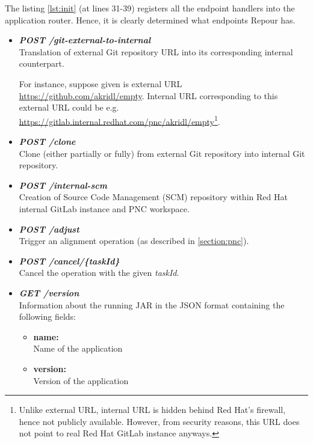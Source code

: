 \documentclass[../main.tex]{subfiles}
\begin{document}
The listing \ref{lst:init} (at lines 31-39) registers all the endpoint handlers into the application router. Hence, it is clearly determined what endpoints Repour has.

\begin{itemize}
    \item \textbf{\textit{POST /git-external-to-internal}}\\
    Translation of external Git repository URL into its corresponding internal counterpart.

    For instance, suppose given is external URL \url{https://github.com/akridl/empty}. Internal URL corresponding to this external URL could be e.g. \url{https://gitlab.internal.redhat.com/pnc/akridl/empty}\footnote{Unlike external URL, internal URL is hidden behind Red Hat's firewall, hence not publicly available. However, from security reasons, this URL does not point to real Red Hat GitLab instance anyways.}.

    \item \textbf{\textit{POST /clone}}\\
    Clone (either partially or fully) from external Git repository into internal Git repository.
    
    \item \textbf{\textit{POST /internal-scm}}\\
    Creation of Source Code Management (SCM) repository within Red Hat internal GitLab instance and PNC workspace.

    \item \textbf{\textit{POST /adjust}}\\
    Trigger an alignment operation (as described in \ref{section:pnc}).

    \item \textbf{\textit{POST /cancel/\{taskId\}}}\\
    Cancel the operation with the given \textit{taskId}.
    
    \item \textbf{\textit{GET /version}}\\
    Information about the running JAR in the JSON format containing the following fields:
    \begin{itemize}
        \item \textbf{name:}\\
        Name of the application

        \item \textbf{version:}\\
        Version of the application


\end{itemize}
\end{itemize}
\end{document}
